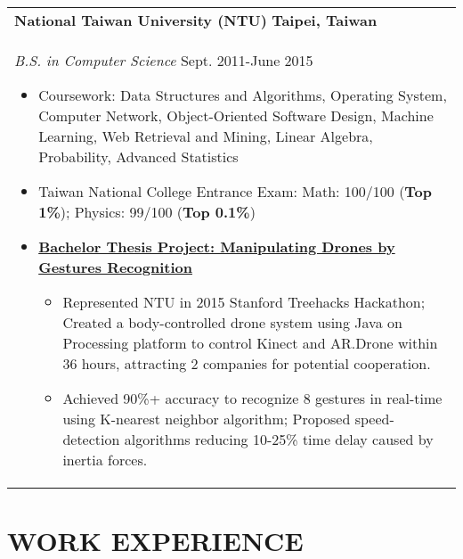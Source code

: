 \documentclass[a4paper,10pt]{article} %
\begin{document}
{\begin{tabular}{p{18.5cm}}
{\fontsize{11}{13.2}\textbf{National Taiwan University (NTU)}} \hfill \textbf{Taipei, Taiwan}\\
{\it B.S. in Computer Science} \hfill Sept. 2011-June 2015
\begin{itemize}
\item Coursework: Data Structures and Algorithms, Operating System, Computer Network, Object-Oriented Software Design, Machine Learning, Web Retrieval and Mining, Linear Algebra, Probability, Advanced Statistics 
\item Taiwan National College Entrance Exam:  Math: 100/100 (\textbf{Top 1\%}); Physics: 99/100 (\textbf{Top 0.1\%})
\item \textbf{\href{https://www.youtube.com/watch?v=jxsZaQ6PcXU}{Bachelor Thesis Project: Manipulating Drones by Gestures Recognition}}
\begin{itemize}
	\item Represented NTU in 2015 Stanford Treehacks Hackathon; Created a body-controlled drone system using Java on Processing platform to control Kinect and AR.Drone within 36 hours, attracting 2 companies for potential cooperation. 
	\item Achieved 90\%+ accuracy to recognize 8 gestures in real-time using K-nearest neighbor algorithm; Proposed speed-detection algorithms reducing 10-25\% time delay caused by inertia forces. \vspace*{-\baselineskip}
\end{itemize}
\end{itemize} 
\end{tabular}

\section{\textbf{WORK EXPERIENCE}}
\begin{tabular}{p{18.5cm}}


\end{tabular}}
\end{document}
